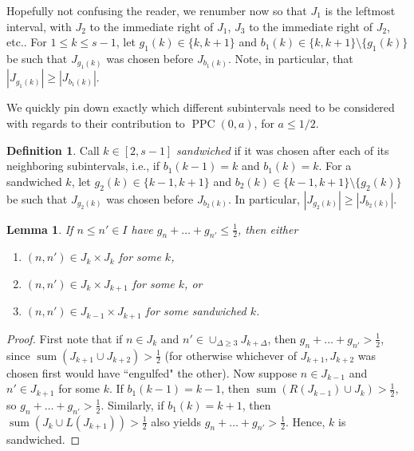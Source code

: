 \documentclass[12pt]{amsart}
\newtheorem{lemma}[proposition]{Lemma}
\theoremstyle{definition}
\newtheorem{definition}[proposition]{Definition}
\newcommand{\vs}{\vspace{3mm}}
\DeclareMathOperator{\PPC}{PPC}
\DeclareMathOperator{\summ}{sum}
\begin{document}
\vs

Hopefully not confusing the reader, we renumber now so that $J_1$ is the leftmost interval, with $J_2$ to the immediate right of $J_1$, $J_3$ to the immediate right of $J_2$, etc.. For $1 \le k \le s-1$, let $g_1(k) \in \{k,k+1\}$ and $b_1(k) \in \{k,k+1\}\setminus \{g_1(k)\}$ be such that $J_{g_1(k)}$ was chosen before $J_{b_1(k)}$. Note, in particular, that $|J_{g_1(k)}| \ge |J_{b_1(k)}|$. 

\vs

We quickly pin down exactly which different subintervals need to be considered with regards to their contribution to $\PPC(0,a)$, for $a \leq 1/2$. 

\vspace{1.5mm}

\begin{definition}
Call $k \in [2,s-1]$ \textit{sandwiched} if it was chosen after each of its neighboring subintervals, i.e., if $b_1(k-1) = k$ and $b_1(k) = k$. For a sandwiched $k$, let $g_2(k) \in \{k-1,k+1\}$ and $b_2(k) \in \{k-1,k+1\}\setminus\{g_2(k)\}$ be such that $J_{g_2(k)}$ was chosen before $J_{b_2(k)}$. In particular, $|J_{g_2(k)}| \ge |J_{b_2(k)}|$. 
\end{definition}

\vspace{1.5mm}

\begin{lemma}\label{trichotomy}
If $n \le n' \in I$ have $g_n+\dots+g_{n'} \le \frac{1}{2}$, then either \begin{enumerate} \item $(n,n') \in J_k\times J_k$ for some $k$, \item $(n,n') \in J_k\times J_{k+1}$ for some $k$, or \item $(n,n') \in J_{k-1}\times J_{k+1}$ for some sandwiched $k$.\end{enumerate}
\end{lemma}

\begin{proof}
First note that if $n \in J_k$ and $n' \in \cup_{\Delta \ge 3} J_{k+\Delta}$, then $g_n+\dots+g_{n'} > \frac{1}{2}$, since $\summ(J_{k+1}\cup J_{k+2}) > \frac{1}{2}$ (for otherwise whichever of $J_{k+1},J_{k+2}$ was chosen first would have ``engulfed" the other). Now suppose $n \in J_{k-1}$ and $n' \in J_{k+1}$ for some $k$. If $b_1(k-1) = k-1$, then $\summ(R(J_{k-1})\cup J_k) > \frac{1}{2}$, so $g_n+\dots+g_{n'} > \frac{1}{2}$. Similarly, if $b_1(k) = k+1$, then $\summ(J_k\cup L(J_{k+1})) > \frac{1}{2}$ also yields $g_n+\dots+g_{n'} > \frac{1}{2}$. Hence, $k$ is sandwiched. \end{proof}
\end{document}
